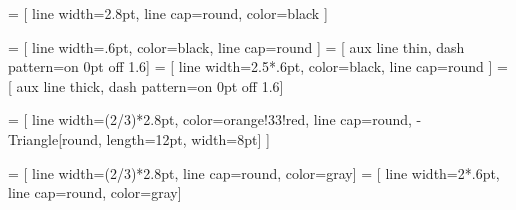 \def\beamlinewidth{2.8pt}
 = [ line width=\beamlinewidth, line cap=round, color=black ]

\def\auxlinewidth{.6pt}
 = [ line width=\auxlinewidth, color=black, line cap=round ]
 = [ aux line thin, dash pattern=on 0pt off 1.6\pgflinewidth ]
 = [ line width=2.5*\auxlinewidth, color=black, line cap=round ]
 = [ aux line thick, dash pattern=on 0pt off 1.6\pgflinewidth ]

\def\colorforforces{orange!33!red}
\def\externalforcecolor{\colorforforces}
 =
	[ line width=(2/3)*\beamlinewidth, color=\externalforcecolor, line cap=round, -{Triangle[round, length=12pt, width=8pt]} ]

\def\textscale{1.2}

\def\reflength{5} %

\pgfmathsetmacro\cornerlength{\reflength / 20}

\pgfmathsetmacro\onePl{\reflength / 3}
\pgfmathsetmacro\justP{\onePl / \reflength}

\def\epurehatchsteps{12} %
\pgfmathsetmacro\hatchstep{\reflength / (\epurehatchsteps - 1)}

\tikzset{
	hatch distance/.store in=\hatchdistance,
	hatch distance=15pt,
	hatch thickness/.store in=\hatchthickness,
	hatch thickness=.6pt %
}

\makeatletter
{}
	{\pgfqpoint{0pt}{0pt}}
	{\pgfqpoint{\hatchdistance}{\hatchdistance}}
	{\pgfpoint{\hatchdistance-1pt}{\hatchdistance-1pt}}%
	{
		\pgfsetcolor{\tikz@pattern@color}
		\pgfsetlinewidth{\hatchthickness}
		\pgfpathmoveto{\pgfqpoint{0pt}{0pt}}
		\pgfpathlineto{\pgfqpoint{\hatchdistance}{\hatchdistance}}
	}
\makeatother

\def\clampsize{.8}
\def\clampcolor{gray}

 = [ line width=(2/3)*\beamlinewidth, line cap=round, color=\clampcolor ]
 = [ line width=2*\auxlinewidth, line cap=round, color=\clampcolor ]

